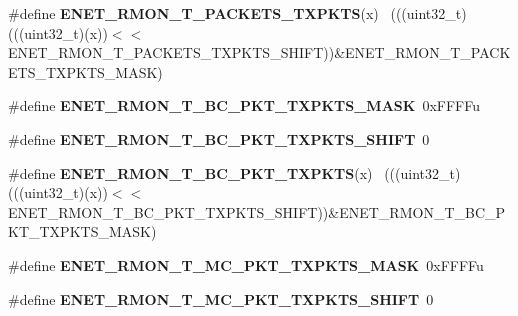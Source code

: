 \begin{DoxyCompactItemize}
\item 
\hypertarget{group___e_n_e_t___register___masks_ga4774bf26fee5dc234289d1c3f6af0a96}{}\#define {\bfseries E\+N\+E\+T\+\_\+\+R\+M\+O\+N\+\_\+\+T\+\_\+\+P\+A\+C\+K\+E\+T\+S\+\_\+\+T\+X\+P\+K\+T\+S}(x)                    ~(((uint32\+\_\+t)(((uint32\+\_\+t)(x))$<$$<$E\+N\+E\+T\+\_\+\+R\+M\+O\+N\+\_\+\+T\+\_\+\+P\+A\+C\+K\+E\+T\+S\+\_\+\+T\+X\+P\+K\+T\+S\+\_\+\+S\+H\+I\+F\+T))\&E\+N\+E\+T\+\_\+\+R\+M\+O\+N\+\_\+\+T\+\_\+\+P\+A\+C\+K\+E\+T\+S\+\_\+\+T\+X\+P\+K\+T\+S\+\_\+\+M\+A\+S\+K)\label{group___e_n_e_t___register___masks_ga4774bf26fee5dc234289d1c3f6af0a96}

\item 
\hypertarget{group___e_n_e_t___register___masks_ga025847a04f4151ea174abb193896779d}{}\#define {\bfseries E\+N\+E\+T\+\_\+\+R\+M\+O\+N\+\_\+\+T\+\_\+\+B\+C\+\_\+\+P\+K\+T\+\_\+\+T\+X\+P\+K\+T\+S\+\_\+\+M\+A\+S\+K}~0x\+F\+F\+F\+Fu\label{group___e_n_e_t___register___masks_ga025847a04f4151ea174abb193896779d}

\item 
\hypertarget{group___e_n_e_t___register___masks_ga85a6d86c558cd12bad95c0bd1fa9ac42}{}\#define {\bfseries E\+N\+E\+T\+\_\+\+R\+M\+O\+N\+\_\+\+T\+\_\+\+B\+C\+\_\+\+P\+K\+T\+\_\+\+T\+X\+P\+K\+T\+S\+\_\+\+S\+H\+I\+F\+T}~0\label{group___e_n_e_t___register___masks_ga85a6d86c558cd12bad95c0bd1fa9ac42}

\item 
\hypertarget{group___e_n_e_t___register___masks_ga29ccf254a06133cb56dc1494e96341cf}{}\#define {\bfseries E\+N\+E\+T\+\_\+\+R\+M\+O\+N\+\_\+\+T\+\_\+\+B\+C\+\_\+\+P\+K\+T\+\_\+\+T\+X\+P\+K\+T\+S}(x)                      ~(((uint32\+\_\+t)(((uint32\+\_\+t)(x))$<$$<$E\+N\+E\+T\+\_\+\+R\+M\+O\+N\+\_\+\+T\+\_\+\+B\+C\+\_\+\+P\+K\+T\+\_\+\+T\+X\+P\+K\+T\+S\+\_\+\+S\+H\+I\+F\+T))\&E\+N\+E\+T\+\_\+\+R\+M\+O\+N\+\_\+\+T\+\_\+\+B\+C\+\_\+\+P\+K\+T\+\_\+\+T\+X\+P\+K\+T\+S\+\_\+\+M\+A\+S\+K)\label{group___e_n_e_t___register___masks_ga29ccf254a06133cb56dc1494e96341cf}

\item 
\hypertarget{group___e_n_e_t___register___masks_gaf3856023c28aa2585937b9b2e3e46fcd}{}\#define {\bfseries E\+N\+E\+T\+\_\+\+R\+M\+O\+N\+\_\+\+T\+\_\+\+M\+C\+\_\+\+P\+K\+T\+\_\+\+T\+X\+P\+K\+T\+S\+\_\+\+M\+A\+S\+K}~0x\+F\+F\+F\+Fu\label{group___e_n_e_t___register___masks_gaf3856023c28aa2585937b9b2e3e46fcd}

\item 
\hypertarget{group___e_n_e_t___register___masks_ga5b480910d2725a8c75b23a0327898400}{}\#define {\bfseries E\+N\+E\+T\+\_\+\+R\+M\+O\+N\+\_\+\+T\+\_\+\+M\+C\+\_\+\+P\+K\+T\+\_\+\+T\+X\+P\+K\+T\+S\+\_\+\+S\+H\+I\+F\+T}~0\label{group___e_n_e_t___register___masks_ga5b480910d2725a8c75b23a0327898400}


\end{DoxyCompactItemize}
